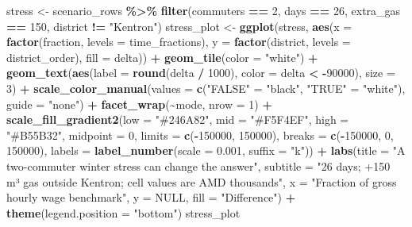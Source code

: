 \documentclass[
]{article}
\newenvironment{Shaded}{\begin{snugshade}}{\end{snugshade}}
\newcommand{\AttributeTok}[1]{\textcolor[rgb]{0.13,0.29,0.53}{#1}}
\newcommand{\ConstantTok}[1]{\textcolor[rgb]{0.56,0.35,0.01}{#1}}
\newcommand{\DecValTok}[1]{\textcolor[rgb]{0.00,0.00,0.81}{#1}}
\newcommand{\FloatTok}[1]{\textcolor[rgb]{0.00,0.00,0.81}{#1}}
\newcommand{\FunctionTok}[1]{\textcolor[rgb]{0.13,0.29,0.53}{\textbf{#1}}}
\newcommand{\NormalTok}[1]{#1}
\newcommand{\OtherTok}[1]{\textcolor[rgb]{0.56,0.35,0.01}{#1}}
\newcommand{\SpecialCharTok}[1]{\textcolor[rgb]{0.81,0.36,0.00}{\textbf{#1}}}
\newcommand{\StringTok}[1]{\textcolor[rgb]{0.31,0.60,0.02}{#1}}
\newcounter{none} %
\begin{document}
\begin{Shaded}
\begin{Highlighting}[]
\NormalTok{stress }\OtherTok{\textless{}{-}}\NormalTok{ scenario\_rows }\SpecialCharTok{\%\textgreater{}\%} \FunctionTok{filter}\NormalTok{(commuters }\SpecialCharTok{==} \DecValTok{2}\NormalTok{, days }\SpecialCharTok{==} \DecValTok{26}\NormalTok{, extra\_gas }\SpecialCharTok{==} \DecValTok{150}\NormalTok{, district }\SpecialCharTok{!=} \StringTok{"Kentron"}\NormalTok{)}
\NormalTok{stress\_plot }\OtherTok{\textless{}{-}} \FunctionTok{ggplot}\NormalTok{(stress, }\FunctionTok{aes}\NormalTok{(}\AttributeTok{x =} \FunctionTok{factor}\NormalTok{(fraction, }\AttributeTok{levels =}\NormalTok{ time\_fractions),}
  \AttributeTok{y =} \FunctionTok{factor}\NormalTok{(district, }\AttributeTok{levels =}\NormalTok{ district\_order), }\AttributeTok{fill =}\NormalTok{ delta)) }\SpecialCharTok{+}
  \FunctionTok{geom\_tile}\NormalTok{(}\AttributeTok{color =} \StringTok{"white"}\NormalTok{) }\SpecialCharTok{+}
  \FunctionTok{geom\_text}\NormalTok{(}\FunctionTok{aes}\NormalTok{(}\AttributeTok{label =} \FunctionTok{round}\NormalTok{(delta }\SpecialCharTok{/} \DecValTok{1000}\NormalTok{), }\AttributeTok{color =}\NormalTok{ delta }\SpecialCharTok{\textless{}} \SpecialCharTok{{-}}\DecValTok{90000}\NormalTok{), }\AttributeTok{size =} \DecValTok{3}\NormalTok{) }\SpecialCharTok{+}
  \FunctionTok{scale\_color\_manual}\NormalTok{(}\AttributeTok{values =} \FunctionTok{c}\NormalTok{(}\StringTok{"FALSE"} \OtherTok{=} \StringTok{"black"}\NormalTok{, }\StringTok{"TRUE"} \OtherTok{=} \StringTok{"white"}\NormalTok{), }\AttributeTok{guide =} \StringTok{"none"}\NormalTok{) }\SpecialCharTok{+}
  \FunctionTok{facet\_wrap}\NormalTok{(}\SpecialCharTok{\textasciitilde{}}\NormalTok{mode, }\AttributeTok{nrow =} \DecValTok{1}\NormalTok{) }\SpecialCharTok{+}
  \FunctionTok{scale\_fill\_gradient2}\NormalTok{(}\AttributeTok{low =} \StringTok{"\#246A82"}\NormalTok{, }\AttributeTok{mid =} \StringTok{"\#F5F4EF"}\NormalTok{, }\AttributeTok{high =} \StringTok{"\#B55B32"}\NormalTok{, }\AttributeTok{midpoint =} \DecValTok{0}\NormalTok{,}
                       \AttributeTok{limits =} \FunctionTok{c}\NormalTok{(}\SpecialCharTok{{-}}\DecValTok{150000}\NormalTok{, }\DecValTok{150000}\NormalTok{), }\AttributeTok{breaks =} \FunctionTok{c}\NormalTok{(}\SpecialCharTok{{-}}\DecValTok{150000}\NormalTok{, }\DecValTok{0}\NormalTok{, }\DecValTok{150000}\NormalTok{),}
                       \AttributeTok{labels =} \FunctionTok{label\_number}\NormalTok{(}\AttributeTok{scale =} \FloatTok{0.001}\NormalTok{, }\AttributeTok{suffix =} \StringTok{"k"}\NormalTok{)) }\SpecialCharTok{+}
  \FunctionTok{labs}\NormalTok{(}\AttributeTok{title =} \StringTok{"A two{-}commuter winter stress can change the answer"}\NormalTok{,}
       \AttributeTok{subtitle =} \StringTok{"26 days; +150 m³ gas outside Kentron; cell values are AMD thousands"}\NormalTok{,}
       \AttributeTok{x =} \StringTok{"Fraction of gross hourly wage benchmark"}\NormalTok{, }\AttributeTok{y =} \ConstantTok{NULL}\NormalTok{, }\AttributeTok{fill =} \StringTok{"Difference"}\NormalTok{) }\SpecialCharTok{+}
  \FunctionTok{theme}\NormalTok{(}\AttributeTok{legend.position =} \StringTok{"bottom"}\NormalTok{)}
\NormalTok{stress\_plot}
\end{Highlighting}
\end{Shaded}
\end{document}
